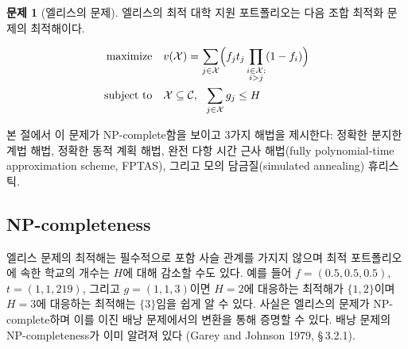 \documentclass[11pt]{article} %
\newif\ifen
\theoremstyle{definition}
\newtheorem{problem}{Problem}
\theoremstyle{definition}
\newtheorem{problem}{문제}
\begin{document}
\begin{problem}[\ifen Ellis's problem\else 엘리스의 문제\fi]
\ifen
Ellis's optimal college application portfolio is given by the solution to the following combinatorial optimization problem.
\else 
엘리스의 최적 대학 지원 포트폴리오는 다음 조합 최적화 문제의 최적해이다.
\fi
\begin{align}
\begin{split}
\text{maximize}\quad &  v(\mathcal{X}) = \sum_{j\in
\mathcal{X}} \Bigl(f_j t_j \prod_{\substack{i \in \mathcal{X}: \\ i > j}} (1 - f_{i}) \Bigr)\\
\text{subject to}\quad & \mathcal{X}\subseteq\mathcal{C},~~\sum_{j \in \mathcal{X}} g_j \leq H 
\end{split}
\end{align}
\end{problem}

\ifen
\noindent In this section, we show that this problem is NP-complete, then provide four algorithmic solutions: an exact branch-and-bound routine, an exact dynamic program, a fully polynomial-time approximation scheme (FPTAS), and a simulated-annealing heuristic. 
\else
\noindent 본 절에서 이 문제가 NP-complete함을 보이고 3가지 해법을 제시한다: 정확한 분지한계법 해법, 정확한 동적 계획 해법, 완전 다항 시간 근사 해법(fully polynomial-time approximation scheme, FPTAS), 그리고 모의 담금질(simulated annealing) 휴리스틱.
\fi

\ifen \subsection{NP-completeness} \else \subsection{NP-completeness}\fi
\ifen
The optima for Ellis's problem are not necessarily nested, nor is the number of schools in the optimal portfolio necessarily increasing in $H$. For example, if
$f = (0.5, 0.5, 0.5)$, $t = (1, 1, 219)$, and $g = (1, 1, 3)$,
then it is evident that the optimal portfolio for $H = 2$ is $\{1, 2\}$ while that for $H = 3$ is $\{3\}$. In fact, Ellis’s problem is NP-complete, as we will show by a transformation from the binary knapsack problem, which is known to be NP-complete (Garey and Johnson 1979, \S\,3.2.1).
\else
엘리스 문제의 최적해는 필수적으로 포함 사슬 관계를 가지지 않으며 최적 포트폴리오에 속한 학교의 개수는 $H$에 대해 감소할 수도 있다. 예를 들어
$f = (0.5, 0.5, 0.5)$, $t = (1, 1, 219)$, 그리고 $g = (1, 1, 3)$이면 $H = 2$에 대응하는 최적해가 $\{1, 2\}$이며 $H = 3$에 대응하는 최적해는 $\{3\}$임을 쉽게 알 수 있다. 사실은 엘리스의 문제가 NP-complete하며 이를 이진 배낭 문제에서의 변환을 통해 증명할 수 있다. 배낭 문제의 NP-completeness가 이미 알려져 있다 (Garey and Johnson 1979, \S\,3.2.1).
\fi
\end{document}
